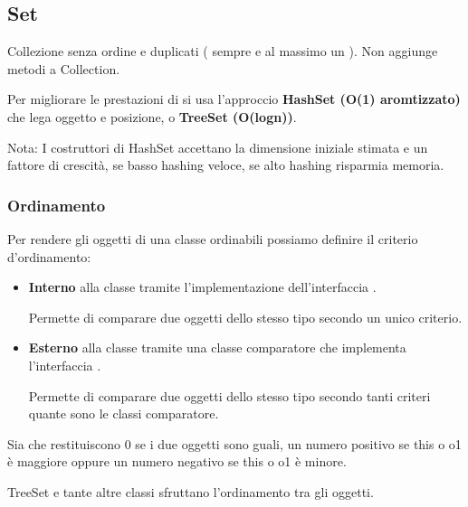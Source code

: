 \subsection{Set}
Collezione senza ordine e duplicati ( sempre  e al massimo un ). Non aggiunge metodi a Collection.

Per migliorare le prestazioni di  si usa l'approccio \textbf{HashSet (O(1) aromtizzato)} che lega oggetto e posizione, o \textbf{TreeSet (O(logn))}.

Nota: I costruttori di HashSet accettano la dimensione iniziale stimata e un fattore di crescità, se basso hashing veloce, se alto hashing risparmia memoria.

\subsubsection{Ordinamento}
Per rendere gli oggetti di una classe ordinabili possiamo definire il criterio d'ordinamento:
\begin{itemize}
	\item \textbf{Interno} alla classe tramite l'implementazione dell'interfaccia .

	Permette di comparare due oggetti dello stesso tipo secondo un unico criterio.


	\item \textbf{Esterno} alla classe tramite una classe comparatore che implementa l'interfaccia .

	Permette di comparare due oggetti dello stesso tipo secondo tanti criteri quante sono le classi comparatore.

\end{itemize}

Sia  che  restituiscono 0 se i due oggetti sono guali, un numero positivo se this o o1 è maggiore oppure un numero negativo se this o o1 è minore.

TreeSet e tante altre classi sfruttano l'ordinamento tra gli oggetti.